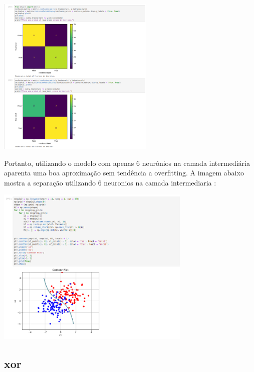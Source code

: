 \documentclass{article}
\begin{document}
\begin{center}

\includegraphics[height=3in]{exercise_pic/normals/conf_matrix_normals30.png}
\vspace{10pt}
    
\end{center}
Portanto, utilizando o modelo com apenas 6 neurônios na camada intermediária aparenta uma boa aproximação sem tendência a overfitting. A imagem abaixo mostra a separação utilizando 6 neuronios na camada intermediaria : 

\begin{center}

\includegraphics[height=3in]{exercise_pic/normals/plot_6_neurons.png}
\vspace{10pt}
    
\end{center}









\subsection{xor}
\end{document}
